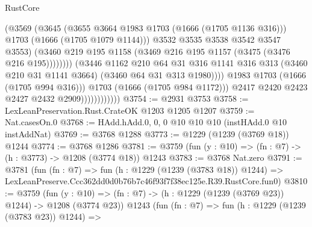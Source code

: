 \begin{lexlean}{RustCore}
\begin{coremodule}
                                            (@3569
                                              (@3645
                                                (@3655 @3664 @1983 @1703 (@1666 (@1705 @1136 @316)))
                                                @1703
                                                (@1666 (@1705 @1079 @1144)))
                                              @3532
                                              @3535
                                              @3538
                                              @3542
                                              @3547
                                              @3553)
                                            (@3460
                                              @219
                                              @195
                                              @1158
                                              (@3469 @216 @195 @1157 (@3475 (@3476 @216 @195))))))))
                                    (@3446
                                      @1162
                                      @210
                                      @64
                                      @31
                                      @316
                                      @1141
                                      @316
                                      @313
                                      (@3460 @210 @31 @1141 @3664)
                                      (@3460 @64 @31 @313 @1980))))
                                @1983
                                @1703
                                (@1666 (@1705 @994 @316)))
                              @1703
                              (@1666 (@1705 @984 @1172)))
                            @2417
                            @2420
                            @2423
                            @2427
                            @2432
                            @2909))))))))))))
@3754 := @2931 @3753
@3758 := LexLeanPreservation.Rust.CrateOK @1203 @1205 @1207
@3759 := Nat.casesOn.{0}
@3768 := HAdd.hAdd.{0, 0, 0} @10 @10 @10 (instHAdd.{0} @10 instAddNat)
@3769 := @3768 @1288
@3773 := @1229 (@1239 (@3769 @18)) @1244
@3774 := @3768 @1286
@3781 := @3759 (fun (y : @10) => (fn : @7) -> (h : @3773) -> @1208 (@3774 @18)) @1243
@3783 := @3768 Nat.zero
@3791 := @3781
    (fun (fn : @7) =>
    fun (h : @1229 (@1239 (@3783 @18)) @1244) =>
    LexLeanPreserve.Ccc362dd0d0b76b7c46f93f7f38ec125e.R39.RustCore.fun0)
@3810 := @3759
    (fun (y : @10) => (fn : @7) -> (h : @1229 (@1239 (@3769 @23)) @1244) -> @1208 (@3774 @23))
    @1243
    (fun (fn : @7) =>
    fun (h : @1229 (@1239 (@3783 @23)) @1244) =>

\end{coremodule}
\end{lexlean}
